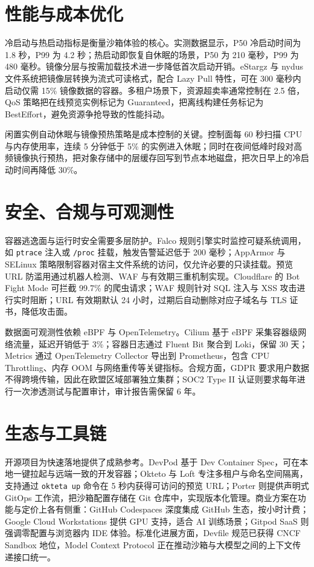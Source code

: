 \chapter{性能与成本优化}
冷启动与热启动指标是衡量沙箱体验的核心。实测数据显示，P50 冷启动时间为 1.8 秒，P99 为 4.2 秒；热启动即恢复自休眠的场景，P50 为 210 毫秒，P99 为 480 毫秒。镜像分层与按需加载技术进一步降低首次启动开销。eStargz 与 nydus 文件系统把镜像层转换为流式可读格式，配合 Lazy Pull 特性，可在 300 毫秒内启动仅需 15\%{} 镜像数据的容器。多租户场景下，资源超卖率通常控制在 2.5 倍，QoS 策略把在线预览实例标记为 Guaranteed，把离线构建任务标记为 BestEffort，避免资源争抢导致的性能抖动。\par
闲置实例自动休眠与镜像预热策略是成本控制的关键。控制面每 60 秒扫描 CPU 与内存使用率，连续 5 分钟低于 5\%{} 的实例进入休眠；同时在夜间低峰时段对高频镜像执行预热，把对象存储中的层缓存回写到节点本地磁盘，把次日早上的冷启动时间再降低 30\%{}。\par
\chapter{安全、合规与可观测性}
容器逃逸面与运行时安全需要多层防护。Falco 规则引擎实时监控可疑系统调用，如 \texttt{ptrace} 注入或 \texttt{/proc} 挂载，触发告警延迟低于 200 毫秒；AppArmor 与 SELinux 策略限制容器对宿主文件系统的访问，仅允许必要的只读挂载。预览 URL 防滥用通过机器人检测、WAF 与有效期三重机制实现。Cloudflare 的 Bot Fight Mode 可拦截 99.7\%{} 的爬虫请求；WAF 规则针对 SQL 注入与 XSS 攻击进行实时阻断；URL 有效期默认 24 小时，过期后自动删除对应子域名与 TLS 证书，降低攻击面。\par
数据面可观测性依赖 eBPF 与 OpenTelemetry。Cilium 基于 eBPF 采集容器级网络流量，延迟开销低于 3\%{}；容器日志通过 Fluent Bit 聚合到 Loki，保留 30 天；Metrics 通过 OpenTelemetry Collector 导出到 Prometheus，包含 CPU Throttling、内存 OOM 与网络重传等关键指标。合规方面，GDPR 要求用户数据不得跨境传输，因此在欧盟区域部署独立集群；SOC2 Type II 认证则要求每年进行一次渗透测试与配置审计，审计报告需保留 6 年。\par
\chapter{生态与工具链}
开源项目为快速落地提供了成熟参考。DevPod 基于 Dev Container Spec，可在本地一键拉起与远端一致的开发容器；Okteto 与 Loft 专注多租户与命名空间隔离，支持通过 \texttt{okteta up} 命令在 5 秒内获得可访问的预览 URL；Porter 则提供声明式 GitOps 工作流，把沙箱配置存储在 Git 仓库中，实现版本化管理。商业方案在功能与定价上各有侧重：GitHub Codespaces 深度集成 GitHub 生态，按小时计费；Google Cloud Workstations 提供 GPU 支持，适合 AI 训练场景；Gitpod SaaS 则强调零配置与浏览器内 IDE 体验。标准化进展方面，Devfile 规范已获得 CNCF Sandbox 地位，Model Context Protocol 正在推动沙箱与大模型之间的上下文传递接口统一。\par
